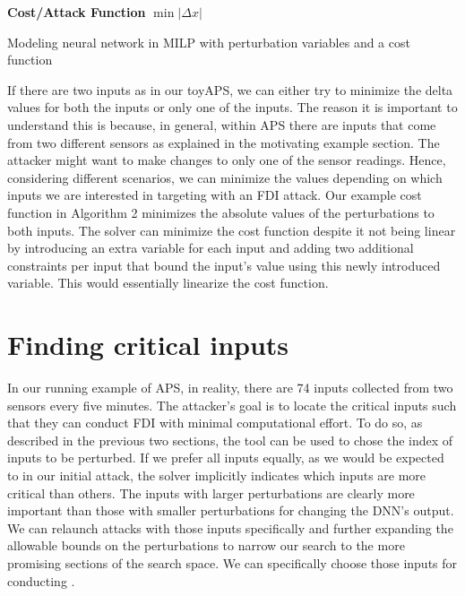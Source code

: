 \begin{algorithm}
	\textbf{Cost/Attack Function} \linebreak
	$\min |\Delta x|$
	\caption{Modeling neural network in MILP with perturbation variables and a cost function}
	\label{algo:b}
\end{algorithm}

If there are two inputs as in our toyAPS, we can either try to minimize the delta values for both the inputs or only one of the inputs. The reason it is important to understand this is because, in general, within APS there are inputs that come from two different sensors as explained in the motivating example section. %
The attacker might want to make changes to only one of the sensor readings. Hence, considering different scenarios, we can minimize the values depending on which inputs we are interested in targeting with an FDI attack. Our example cost function in Algorithm 2 minimizes the absolute values of the perturbations to both inputs.
The solver can minimize the cost function despite it not being linear by introducing an extra variable for each input and adding two additional constraints per input that bound the input's value using this newly introduced variable. This would essentially linearize the cost function.

\section{Finding critical inputs}
In our running example of APS, in reality, there are 74 inputs collected from two sensors every five minutes. The attacker's goal is to locate the critical inputs such that they can conduct FDI with minimal computational effort. To do so, as described in the previous two sections, the tool can be used to chose the index of inputs to be perturbed.
If we prefer all inputs equally, as we would be expected to in our initial attack, the solver implicitly indicates which inputs are more critical than others. The inputs with larger perturbations are clearly more important than those with smaller perturbations for changing the DNN's output.
We can relaunch attacks with those inputs specifically and further expanding the allowable bounds on the perturbations to narrow our search to the more promising sections of the search space.
We can specifically choose those inputs for conducting \attack.

